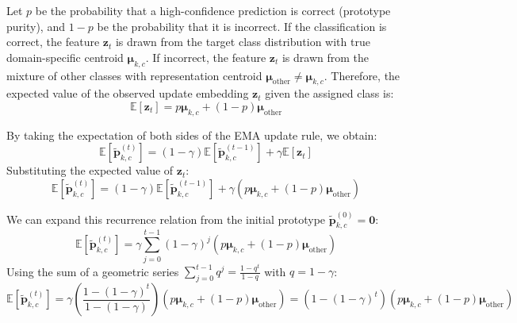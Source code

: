 \documentclass{article}
\theoremstyle{plain}
\theoremstyle{definition}
\theoremstyle{remark}
\begin{document}
Let $p$ be the probability that a high-confidence prediction is correct (prototype purity), and $1-p$ be the probability that it is incorrect. If the classification is correct, the feature $\boldsymbol{z}_t$ is drawn from the target class distribution with true domain-specific centroid $\boldsymbol{\mu}_{k,c}$. If incorrect, the feature $\boldsymbol{z}_t$ is drawn from the mixture of other classes with representation centroid $\boldsymbol{\mu}_{\text{other}} \neq \boldsymbol{\mu}_{k,c}$.
Therefore, the expected value of the observed update embedding $\boldsymbol{z}_t$ given the assigned class is:
\begin{equation}
    \mathbb{E}[\boldsymbol{z}_t] = p \boldsymbol{\mu}_{k,c} + (1-p) \boldsymbol{\mu}_{\text{other}}
\end{equation}

By taking the expectation of both sides of the EMA update rule, we obtain:
\begin{equation}
    \mathbb{E}[\tilde{\boldsymbol{p}}_{k,c}^{(t)}] = (1 - \gamma) \mathbb{E}[\tilde{\boldsymbol{p}}_{k,c}^{(t-1)}] + \gamma \mathbb{E}[\boldsymbol{z}_t]
\end{equation}
Substituting the expected value of $\boldsymbol{z}_t$:
\begin{equation}
    \mathbb{E}[\tilde{\boldsymbol{p}}_{k,c}^{(t)}] = (1 - \gamma) \mathbb{E}[\tilde{\boldsymbol{p}}_{k,c}^{(t-1)}] + \gamma \left( p \boldsymbol{\mu}_{k,c} + (1-p) \boldsymbol{\mu}_{\text{other}} \right)
\end{equation}

We can expand this recurrence relation from the initial prototype $\tilde{\boldsymbol{p}}_{k,c}^{(0)} = \boldsymbol{0}$:
\begin{equation}
    \mathbb{E}[\tilde{\boldsymbol{p}}_{k,c}^{(t)}] = \gamma \sum_{j=0}^{t-1} (1-\gamma)^j \left( p \boldsymbol{\mu}_{k,c} + (1-p) \boldsymbol{\mu}_{\text{other}} \right)
\end{equation}
Using the sum of a geometric series $\sum_{j=0}^{t-1} q^j = \frac{1 - q^t}{1 - q}$ with $q = 1-\gamma$:
\begin{equation}
    \mathbb{E}[\tilde{\boldsymbol{p}}_{k,c}^{(t)}] = \gamma \left( \frac{1 - (1-\gamma)^t}{1 - (1-\gamma)} \right) \left( p \boldsymbol{\mu}_{k,c} + (1-p) \boldsymbol{\mu}_{\text{other}} \right) = \left( 1 - (1-\gamma)^t \right) \left( p \boldsymbol{\mu}_{k,c} + (1-p) \boldsymbol{\mu}_{\text{other}} \right)
\end{equation}
\end{document}
